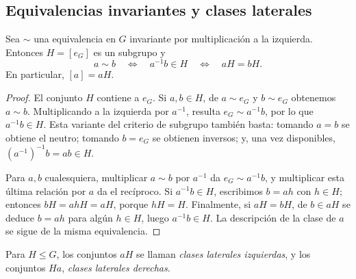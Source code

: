 \subsection{Equivalencias invariantes y clases laterales}\label{tema:5-2-1}
\begin{prop}\label{prop:C5-clases}
Sea $\sim$ una equivalencia en $G$ invariante por multiplicación a la izquierda. Entonces $H=[e_G]$ es un subgrupo y
\[
a\sim b\quad\Longleftrightarrow\quad a^{-1}b\in H
\quad\Longleftrightarrow\quad aH=bH.
\]
En particular, $[a]=aH$.
\end{prop}
\begin{proof}
El conjunto $H$ contiene a $e_G$. Si $a,b\in H$, de $a\sim e_G$ y $b\sim e_G$ obtenemos $a\sim b$. Multiplicando a la izquierda por $a^{-1}$, resulta $e_G\sim a^{-1}b$, por lo que $a^{-1}b\in H$. Esta variante del criterio de subgrupo también basta: tomando $a=b$ se obtiene el neutro; tomando $b=e_G$ se obtienen inversos; y, una vez disponibles, $(a^{-1})^{-1}b=ab\in H$.

Para $a,b$ cualesquiera, multiplicar $a\sim b$ por $a^{-1}$ da $e_G\sim a^{-1}b$, y multiplicar esta última relación por $a$ da el recíproco. Si $a^{-1}b\in H$, escribimos $b=ah$ con $h\in H$; entonces $bH=ahH=aH$, porque $hH=H$. Finalmente, si $aH=bH$, de $b\in aH$ se deduce $b=ah$ para algún $h\in H$, luego $a^{-1}b\in H$. La descripción de la clase de $a$ se sigue de la misma equivalencia.
\end{proof}

\begin{defi}
Para $H\le G$, los conjuntos $aH$ se llaman \emph{clases laterales izquierdas}, y los conjuntos $Ha$, \emph{clases laterales derechas}.
\end{defi}

